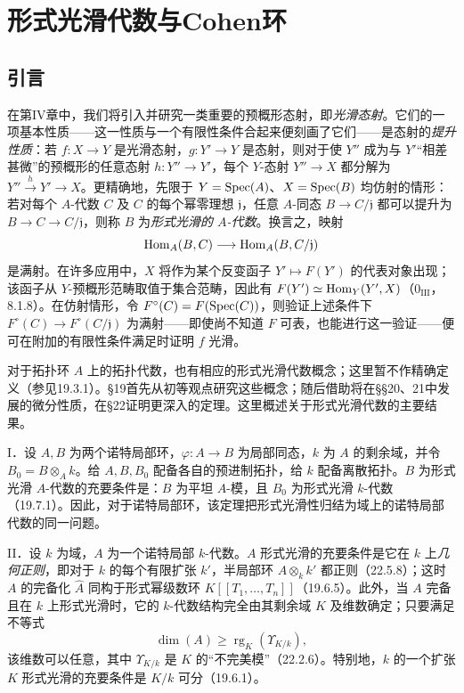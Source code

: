 \setcounter{section}{18}
\section{形式光滑代数与Cohen环}
\setcounter{subsection}{-1}
\subsection{引言}
在第IV章中，我们将引入并研究一类重要的预概形态射，即\emph{光滑态射}。它们的一项基本性质——这一性质与一个有限性条件合起来便刻画了它们——是态射的\emph{提升性质}：若 $f:X\to Y$ 是光滑态射，$g:Y'\to Y$ 是态射，则对于使 $Y''$ 成为与 $Y'$“相差甚微”的预概形的任意态射 $h:Y''\to Y'$，每个 $Y$-态射 $Y''\to X$ 都分解为 $Y''\xrightarrow{h}Y'\to X$。更精确地，先限于 $Y=\operatorname{Spec}(A)$、$X=\operatorname{Spec}(B)$ 均仿射的情形：若对每个 $A$-代数 $C$ 及 $C$ 的每个幂零理想 $\mathfrak j$，任意 $A$-同态 $B\to C/\mathfrak j$ 都可以提升为 $B\to C\to C/\mathfrak j$，则称 $B$ 为\emph{形式光滑的 $A$-代数}。换言之，映射
\[
 \operatorname{Hom}_A(B,C)\longrightarrow\operatorname{Hom}_A(B,C/\mathfrak j)
\]
是满射。在许多应用中，$X$ 将作为某个反变函子 $Y'\mapsto F(Y')$ 的代表对象出现；该函子从 $Y$-预概形范畴取值于集合范畴，因此有 $F(Y')\simeq\operatorname{Hom}_Y(Y',X)$（$0_{\mathrm{III}}$，8.1.8）。在仿射情形，令 $F^\circ(C)=F(\operatorname{Spec}(C))$，则验证上述条件下 $F^\circ(C)\to F^\circ(C/\mathfrak j)$ 为满射——即使尚不知道 $F$ 可表，也能进行这一验证——便可在附加的有限性条件满足时证明 $f$ 光滑。

对于拓扑环 $A$ 上的拓扑代数，也有相应的形式光滑代数概念；这里暂不作精确定义（参见19.3.1）。§19首先从初等观点研究这些概念；随后借助将在§§20、21中发展的微分性质，在§22证明更深入的定理。这里概述关于形式光滑代数的主要结果。

\noindent I．设 $A,B$ 为两个诺特局部环，$\varphi:A\to B$ 为局部同态，$k$ 为 $A$ 的剩余域，并令 $B_0=B\otimes_Ak$。给 $A,B,B_0$ 配备各自的预进制拓扑，给 $k$ 配备离散拓扑。$B$ 为形式光滑 $A$-代数的充要条件是：$B$ 为平坦 $A$-模，且 $B_0$ 为形式光滑 $k$-代数（19.7.1）。因此，对于诺特局部环，该定理把形式光滑性归结为域上的诺特局部代数的同一问题。

\noindent II．设 $k$ 为域，$A$ 为一个诺特局部 $k$-代数。$A$ 形式光滑的充要条件是它在 $k$ 上\emph{几何正则}，即对于 $k$ 的每个有限扩张 $k'$，半局部环 $A\otimes_kk'$ 都正则（22.5.8）；这时 $A$ 的完备化 $\widehat A$ 同构于形式幂级数环 $K[[T_1,\ldots,T_n]]$（19.6.5）。此外，当 $A$ 完备且在 $k$ 上形式光滑时，它的 $k$-代数结构完全由其剩余域 $K$ 及维数确定；只要满足不等式
\[
 \dim(A)\geq\operatorname{rg}_{K}(\Upsilon_{K/k}),
\]
该维数可以任意，其中 $\Upsilon_{K/k}$ 是 $K$ 的“不完美模”（22.2.6）。特别地，$k$ 的一个扩张 $K$ 形式光滑的充要条件是 $K/k$ 可分（19.6.1）。


